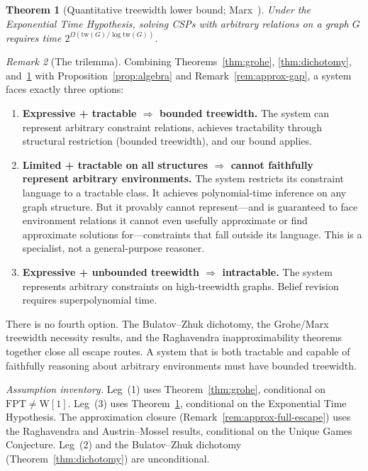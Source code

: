 \documentclass[11pt,a4paper]{article}
\theoremstyle{plain}
\newtheorem{theorem}{Theorem}[section]
\theoremstyle{definition}
\theoremstyle{remark}
\newtheorem{remark}[theorem]{Remark}
\begin{document}
\begin{theorem}[Quantitative treewidth lower bound; Marx~\cite{Marx10}]\label{thm:marx}
Under the Exponential Time Hypothesis, solving CSPs with arbitrary relations on a graph $G$ requires time $2^{\Omega(\mathrm{tw}(G) / \log \mathrm{tw}(G))}$.
\end{theorem}

\begin{remark}[The trilemma]\label{rem:trilemma}
Combining Theorems~\ref{thm:grohe}, \ref{thm:dichotomy}, and~\ref{thm:marx} with Proposition~\ref{prop:algebra} and Remark~\ref{rem:approx-gap}, a system faces exactly three options:
\begin{enumerate}[nosep,label=(\arabic*)]
  \item \textbf{Expressive + tractable $\Rightarrow$ bounded treewidth.}
  The system can represent arbitrary constraint relations, achieves tractability through structural restriction (bounded treewidth), and our bound applies.
  \item \textbf{Limited + tractable on all structures $\Rightarrow$ cannot faithfully represent arbitrary environments.}
  The system restricts its constraint language to a tractable class.
  It achieves polynomial-time inference on any graph structure.
  But it provably cannot represent---and is guaranteed to face environment relations it cannot even usefully approximate or find approximate solutions for---constraints that fall outside its language.
  This is a specialist, not a general-purpose reasoner.
  \item \textbf{Expressive + unbounded treewidth $\Rightarrow$ intractable.}
  The system represents arbitrary constraints on high-treewidth graphs.
  Belief revision requires superpolynomial time.
\end{enumerate}
There is no fourth option.
The Bulatov--Zhuk dichotomy, the Grohe/Marx treewidth necessity results, and the Raghavendra inapproximability theorems together close all escape routes.
A system that is both tractable and capable of faithfully reasoning about arbitrary environments must have bounded treewidth.

\emph{Assumption inventory.}
Leg~(1) uses Theorem~\ref{thm:grohe}, conditional on $\mathrm{FPT} \neq \mathrm{W}[1]$.
Leg~(3) uses Theorem~\ref{thm:marx}, conditional on the Exponential Time Hypothesis.
The approximation closure (Remark~\ref{rem:approx-full-escape}) uses the Raghavendra and Austrin--Mossel results, conditional on the Unique Games Conjecture.
Leg~(2) and the Bulatov--Zhuk dichotomy (Theorem~\ref{thm:dichotomy}) are unconditional.
\end{remark}
\end{document}
